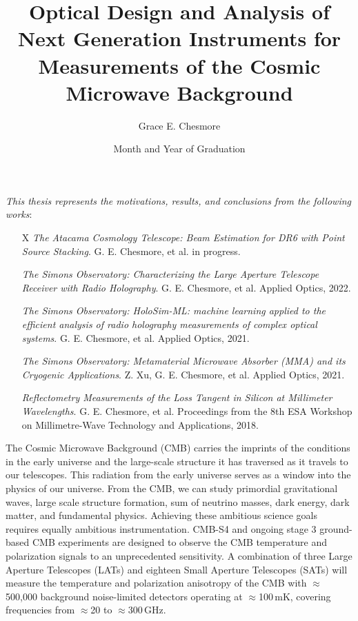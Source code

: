 \documentclass{ucetd}
\title{Optical Design and Analysis of Next Generation Instruments for Measurements of the Cosmic Microwave Background
}
\author{Grace E. Chesmore}
\date{Month and Year of Graduation}  %
\begin{document}
\maketitle

\makecopyright

\tableofcontents
\cleardoublepage
{}
\listoffigures
\cleardoublepage
{}
\listoftables
\newpage

\begin{center}
    \textit{This thesis represents the motivations, results, and conclusions from the following works}:
    \\
    \begin{enumerate}
        \item[X] \textit{The Atacama Cosmology Telescope: Beam Estimation for DR6 with Point Source Stacking}. G. E. Chesmore, et al. in progress.
        \item[\cite{chesmore2022}] \textit{The Simons Observatory: Characterizing the Large Aperture Telescope Receiver with Radio Holography}. G. E. Chesmore, et al. Applied Optics, 2022.
        \item[\cite{Chesmore:21}] \textit{The Simons Observatory: HoloSim-ML: machine learning applied to the efficient analysis of radio holography measurements of complex optical systems}. G. E. Chesmore, et al. Applied Optics, 2021.
        \item[\cite{Xu_2021}] \textit{The Simons Observatory: Metamaterial Microwave Absorber (MMA) and its Cryogenic Applications}. Z. Xu, G. E. Chesmore, et al. Applied Optics, 2021.
        \item[\cite{ches18}] \textit{Reflectometry Measurements of the Loss Tangent in Silicon at Millimeter Wavelengths}. G. E. Chesmore, et al. Proceedings from the 8th ESA Workshop on Millimetre-Wave Technology and Applications, 2018.
    \end{enumerate}

\end{center}
\newpage

\abstract
The Cosmic Microwave Background (CMB) carries the imprints of the conditions in the early universe and the large-scale structure it has traversed as it travels to our telescopes. This radiation from the early universe serves as a window into the physics of our universe. From the CMB, we can study primordial gravitational waves, large scale structure formation, sum of neutrino masses, dark energy, dark matter, and fundamental physics. Achieving these ambitious science goals requires equally ambitious instrumentation.
CMB-S4 and ongoing stage 3 ground-based CMB experiments are designed to observe the CMB temperature and polarization signals to an unprecedented sensitivity. A combination of three Large Aperture Telescopes (LATs) and eighteen Small Aperture Telescopes (SATs) will measure the temperature and polarization anisotropy of the CMB with $\approx$500,000 background noise-limited detectors operating at $\approx$100\,mK, covering frequencies from $\approx$20 to $\approx$300\,GHz.
\end{document}
